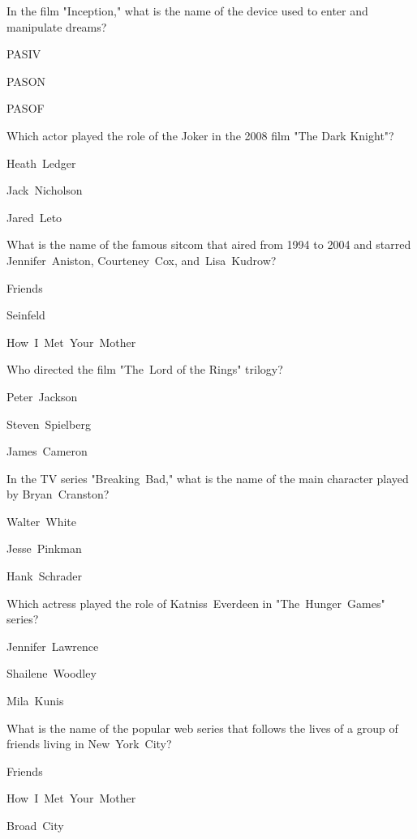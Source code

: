 
\begin{enhancedmcq}{In the film "Inception," what is the name of the device used to enter and manipulate dreams?}
\item PASIV
\item PASON
\item PASOF

\end{enhancedmcq}
\begin{enhancedmcq}{Which actor played the role of the Joker in the 2008 film "The Dark Knight"?}
\item Heath Ledger
\item Jack Nicholson
\item Jared Leto

\end{enhancedmcq}
\begin{enhancedmcq}{What is the name of the famous sitcom that aired from 1994 to 2004 and starred Jennifer Aniston, Courteney Cox, and Lisa Kudrow?}
\item Friends
\item Seinfeld
\item How I Met Your Mother

\end{enhancedmcq}
\begin{enhancedmcq}{Who directed the film "The Lord of the Rings" trilogy?}
\item Peter Jackson
\item Steven Spielberg
\item James Cameron

\end{enhancedmcq}
\begin{enhancedmcq}{In the TV series "Breaking Bad," what is the name of the main character played by Bryan Cranston?}
\item Walter White
\item Jesse Pinkman
\item Hank Schrader

\end{enhancedmcq}
\begin{enhancedmcq}{Which actress played the role of Katniss Everdeen in "The Hunger Games" series?}
\item Jennifer Lawrence
\item Shailene Woodley
\item Mila Kunis

\end{enhancedmcq}
\begin{enhancedmcq}{What is the name of the popular web series that follows the lives of a group of friends living in New York City?}
\item Friends
\item How I Met Your Mother
\item Broad City

\end{enhancedmcq}
